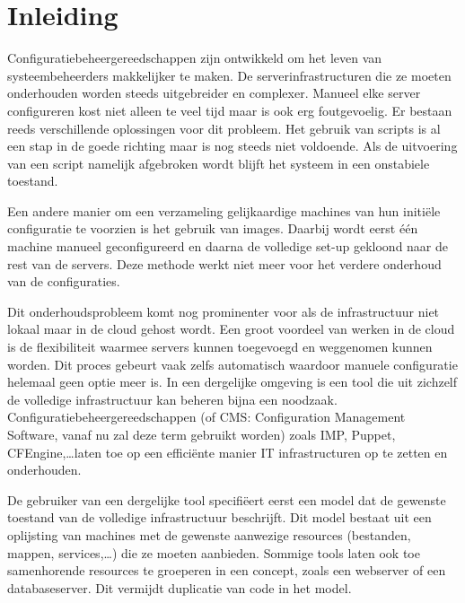 \chapter{Inleiding}
\label{inleiding}
Configuratiebeheergereedschappen zijn ontwikkeld om het leven van systeembeheerders makkelijker te maken.
De serverinfrastructuren die ze moeten onderhouden worden steeds uitgebreider en complexer.
Manueel elke server configureren kost niet alleen te veel tijd maar is ook erg foutgevoelig.
Er bestaan reeds verschillende oplossingen voor dit probleem.
Het gebruik van scripts is al een stap in de goede richting maar is nog steeds niet voldoende.\cite{sysadvent}
Als de uitvoering van een script namelijk afgebroken wordt blijft het systeem in een onstabiele toestand.

Een andere manier om een verzameling gelijkaardige machines van hun initi\"ele configuratie te voorzien is het gebruik van images.
Daarbij wordt eerst \'e\'en machine manueel geconfigureerd en daarna de volledige set-up gekloond naar de rest van de servers.
Deze methode werkt niet meer voor het verdere onderhoud van de configuraties.

Dit onderhoudsprobleem komt nog prominenter voor als de infrastructuur niet lokaal maar in de cloud gehost wordt.
Een groot voordeel van werken in de cloud is de flexibiliteit waarmee servers kunnen toegevoegd en weggenomen kunnen worden.
Dit proces gebeurt vaak zelfs automatisch waardoor manuele configuratie helemaal geen optie meer is. 
In een dergelijke omgeving is een tool die uit zichzelf de volledige infrastructuur kan beheren bijna een noodzaak.
Configuratiebeheergereedschappen (of CMS: Configuration Management Software, vanaf nu zal deze term gebruikt worden) zoals IMP\cite{IMP}, Puppet\cite{puppet}, CFEngine\cite{cfengine},\ldots laten toe op een effici\"ente manier IT infrastructuren op te zetten en onderhouden.

De gebruiker van een dergelijke tool specifi\"eert eerst een model dat de gewenste toestand van de volledige infrastructuur beschrijft.
Dit model bestaat uit een oplijsting van machines met de gewenste aanwezige resources (bestanden, mappen, services,\ldots) die ze moeten aanbieden.
Sommige tools laten ook toe samenhorende resources te groeperen in een concept, zoals een webserver of een databaseserver.
Dit vermijdt duplicatie van code in het model.

